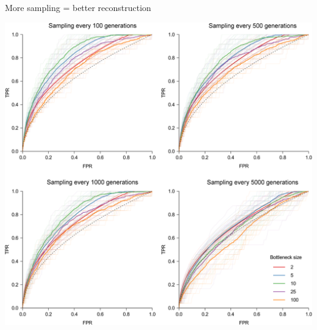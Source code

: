 \documentclass{beamer}
\begin{document}
\begin{frame}{More sampling = better reconstruction}
    \begin{center}
        \includegraphics[scale=1.5]{f3}
    \end{center}
\end{frame}
\end{document}

